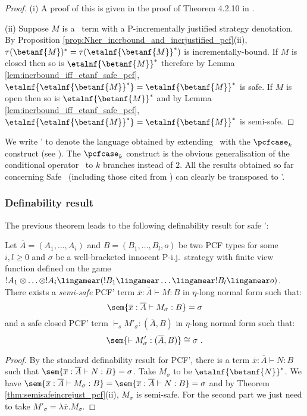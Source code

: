 \begin{proof}
\noindent(i)
A proof of this is given in the proof of Theorem 4.2.10 in \cite{blumtransfer}.

\noindent(ii) Suppose $M$ is a \pcf\ term with a P-incrementally
justified strategy denotation. By Proposition
\ref{prop:Nher_incrbound_and_incrjustified_pcf}(ii),
$\tau(\betanf{M})^* = \tau(\etalnf{\betanf{M}}^*)$ is
incrementally-bound. If $M$ is closed then so is
$\etalnf{\betanf{M}}^*$ therefore by Lemma
\ref{lem:incrbound_iff_etanf_safe_pcf},
$\etalnf{\etalnf{\betanf{M}}^*} = \etalnf{\betanf{M}}^*$ is safe. If
$M$ is open then so is $\etalnf{\betanf{M}}^*$ and by Lemma
\ref{lem:incrbound_iff_etanf_safe_pcf},
$\etalnf{\etalnf{\betanf{M}}^*} = \etalnf{\betanf{M}}^*$ is
semi-safe.
\end{proof}


We write \pcf' to denote the language obtained by extending \pcf\
with the $\pcfcase_k$ construct (see \cite{Abr02}).
The $\pcfcase_k$ construct is the obvious generalisation of the
conditional operator \pcfcond\ to $k$ branches instead of $2$. All the results obtained so far concerning Safe \pcf\ (including those
cited from \cite{blumtransfer}) can clearly be transposed to \pcf'.

\subsubsection{Definability result}

The previous theorem leads to the following definability result for safe \pcf':
\begin{proposition}
\label{prop:safetydefinability} Let $\overline{A}=(A_1,\ldots, A_i)$
and $B =(B_1, \ldots, B_l,o)$ be two PCF types for some $i,l\geq 0$
and $\sigma$ be a well-bracketed innocent P-i.j.\ strategy with
finite view function defined on the game $!A_1 \otimes \ldots
\otimes !A_i \lingamear (!B_1 \lingamear \ldots \lingamear !B_l
\lingamear o) $. There exists a \emph{semi-safe} PCF' term
$\overline{x} : \overline{A} \vdash M : B$ in $\eta$-long normal
form such that:
$$ \sem{\overline{x} : \overline{A} \vdash M_\sigma : B} = \sigma $$
and a safe closed PCF' term $\vdash_s M'_\sigma : (\overline{A},B)$ in $\eta$-long normal form such that:
$$ \sem{\vdash M'_\sigma : (\overline{A},B)} \cong \sigma \ .$$
\end{proposition}
\begin{proof}
By the standard definability result for PCF', there is a term
$\overline{x} : \overline{A} \vdash N : B$ such that
$\sem{\overline{x} :\overline{A} \vdash N : B} = \sigma$. Take
$M_\sigma$ to be $\etalnf{\betanf{N}}^* $. We have
$\sem{\overline{x} : \overline{A} \vdash M_\sigma : B} =
\sem{\overline{x} :\overline{A} \vdash N : B} = \sigma$ and by
Theorem  \ref{thm:semisafeincrejust_pcf}(ii), $M_\sigma$ is
semi-safe. For the second part we just need to take $M'_\sigma =
\lambda \overline{x}. M_\sigma$.
\end{proof}



